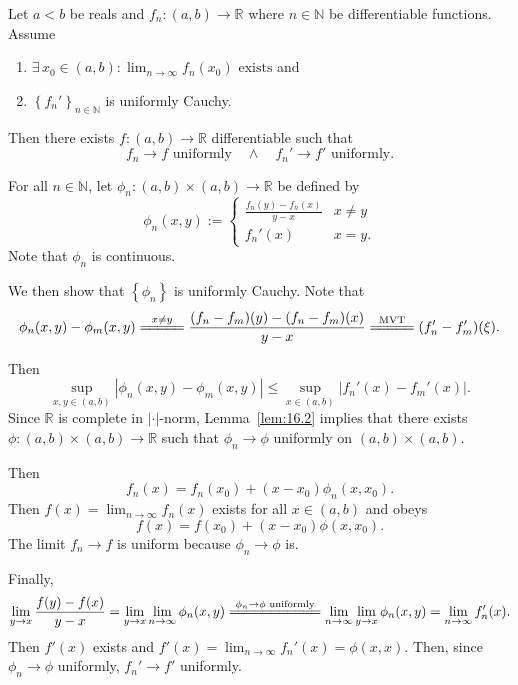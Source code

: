 \documentclass{notes}
\begin{document}
\begin{thm}
  Let $a < b$ be reals and $f_n \colon (a, b) \to \mathbb R$ where $n \in \mathbb N$ be differentiable functions.
  Assume 
  \begin{enumerate}
    \item $\exists \, x_0 \in (a, b): \lim_{n \to \infty} f_n(x_0) \text{ exists}$ and 
      
    \item $\left \{ f_n' \right \}_{n \in \mathbb N}$ is uniformly Cauchy.
  \end{enumerate}
  Then there exists $f \colon (a, b) \to \mathbb R$ differentiable such that 
  \[
    f_n \to f \text{ uniformly} \quad \land \quad f_n' \to f' \text{ uniformly.}
  \]
\end{thm}

\begin{prf}
  For all $n \in \mathbb N$, let $\phi_n \colon (a, b) \times (a, b) \to \mathbb R$ be defined by 
  \[
    \phi_n(x, y) := \begin{cases}
      \frac{f_n(y) - f_n(x)}{y - x} & x \neq y \\ 
      f_n'(x) & x = y.
    \end{cases}
  \]
  Note that $\phi_n$ is continuous.
  
  We then show that $\left \{ \phi_n \right \}$ is uniformly Cauchy.
  Note that 
  \[
    \phi_n(x, y) - \phi_m(x, y) \overset{x \neq y}{=\joinrel=\joinrel=\joinrel=\joinrel=} \frac{(f_n - f_m)(y) - (f_n - f_m)(x)}{y - x} \overset{\text{MVT}}{=\joinrel=\joinrel=\joinrel=\joinrel=} (f_n' - f_m')(\xi).
  \]

  Then 
  \[
    \sup_{x, y \in (a, b)} \left | \phi_n(x, y) - \phi_m(x, y) \right | \leq \sup_{x \in (a, b)} \left | f_n'(x) - f_m'(x) \right |.
  \]
  Since $\mathbb R$ is complete in $\left | \cdot \right |$-norm, Lemma~\ref{lem:16.2} implies that there exists $\phi \colon (a, b) \times (a, b) \to \mathbb R$ such that $\phi_n \to \phi$ uniformly on $(a, b) \times (a, b)$.

  Then 
  \[
    f_n(x) = f_n(x_0) + (x - x_0) \phi_n(x, x_0).
  \]
  Then $f(x) = \lim_{n \to \infty} f_n(x)$ exists for all $x \in (a, b)$ and obeys 
  \[
    f(x) = f(x_0) + (x - x_0) \phi(x, x_0).
  \]
  The limit $f_n \to f$ is uniform because $\phi_n \to \phi$ is.

  Finally, 
  \[
    \lim_{y \to x} \frac{f(y) - f(x)}{y - x} = \lim_{y \to x} \lim_{n \to \infty} \phi_n(x, y) \overset{\phi_n \to \phi \text{ uniformly}}{=\joinrel=\joinrel=\joinrel=\joinrel=\joinrel=\joinrel=\joinrel=\joinrel=\joinrel=\joinrel=} \lim_{n \to \infty} \lim_{y \to x} \phi_n(x, y) = \lim_{n \to \infty} f_n'(x).
  \]
  Then $f'(x)$ exists and $f'(x) = \lim_{n \to \infty} f_n'(x) = \phi(x, x)$.
  Then, since $\phi_n \to \phi$ uniformly, $f_n' \to f'$ uniformly.
\end{prf}
\end{document}
